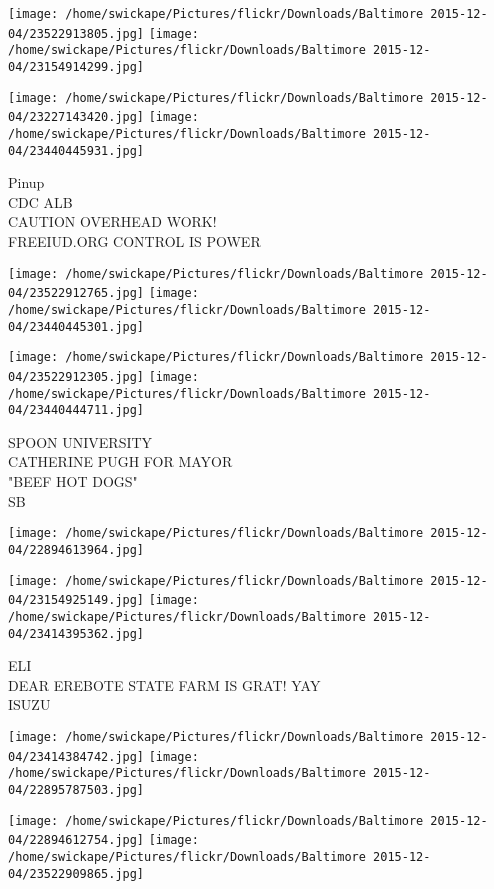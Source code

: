 \documentclass[10pt,letterpaper]{article}
\begin{document}
\texttt{[image: /home/swickape/Pictures/flickr/Downloads/Baltimore 2015-12-04/23522913805.jpg]}
\texttt{[image: /home/swickape/Pictures/flickr/Downloads/Baltimore 2015-12-04/23154914299.jpg]}

\texttt{[image: /home/swickape/Pictures/flickr/Downloads/Baltimore 2015-12-04/23227143420.jpg]}
\texttt{[image: /home/swickape/Pictures/flickr/Downloads/Baltimore 2015-12-04/23440445931.jpg]}

Pinup\\
CDC ALB\\
CAUTION OVERHEAD WORK!\\
FREEIUD.ORG CONTROL IS POWER\\
\pagebreak

\texttt{[image: /home/swickape/Pictures/flickr/Downloads/Baltimore 2015-12-04/23522912765.jpg]}
\texttt{[image: /home/swickape/Pictures/flickr/Downloads/Baltimore 2015-12-04/23440445301.jpg]}

\texttt{[image: /home/swickape/Pictures/flickr/Downloads/Baltimore 2015-12-04/23522912305.jpg]}
\texttt{[image: /home/swickape/Pictures/flickr/Downloads/Baltimore 2015-12-04/23440444711.jpg]}

SPOON UNIVERSITY\\
CATHERINE PUGH FOR MAYOR\\
"BEEF HOT DOGS"\\
SB\\
\pagebreak

\texttt{[image: /home/swickape/Pictures/flickr/Downloads/Baltimore 2015-12-04/22894613964.jpg]}

\vspace{0.25in}
\texttt{[image: /home/swickape/Pictures/flickr/Downloads/Baltimore 2015-12-04/23154925149.jpg]}
\texttt{[image: /home/swickape/Pictures/flickr/Downloads/Baltimore 2015-12-04/23414395362.jpg]}

ELI\\
DEAR EREBOTE STATE FARM IS GRAT!  YAY\\
ISUZU\\
\pagebreak

\texttt{[image: /home/swickape/Pictures/flickr/Downloads/Baltimore 2015-12-04/23414384742.jpg]}
\texttt{[image: /home/swickape/Pictures/flickr/Downloads/Baltimore 2015-12-04/22895787503.jpg]}

\texttt{[image: /home/swickape/Pictures/flickr/Downloads/Baltimore 2015-12-04/22894612754.jpg]}
\texttt{[image: /home/swickape/Pictures/flickr/Downloads/Baltimore 2015-12-04/23522909865.jpg]}
\end{document}
